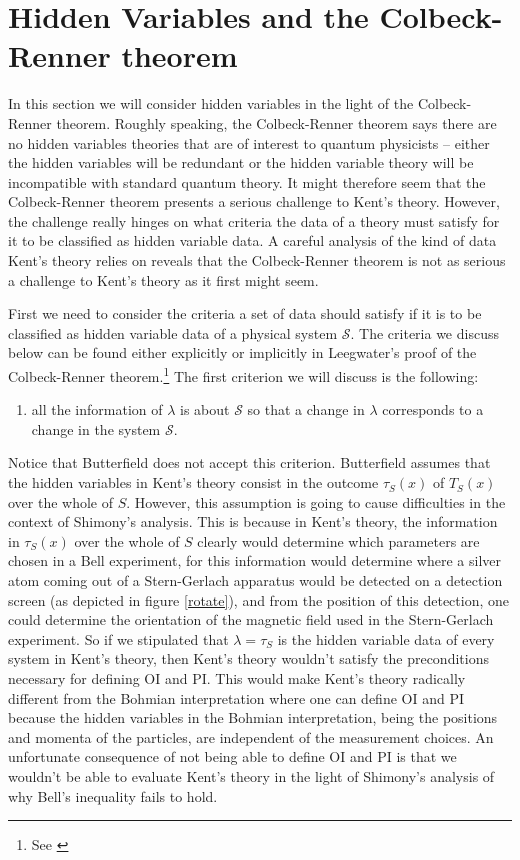 
\section{Hidden Variables and the Colbeck-Renner theorem\label{colbeckrennerthm}}
In this section we will consider hidden variables in the light of the Colbeck-Renner theorem. Roughly speaking, the Colbeck-Renner theorem says there are no hidden variables theories that are of interest to quantum physicists -- either the hidden variables will be redundant or the hidden variable theory will be incompatible with standard quantum theory. It might therefore seem that the Colbeck-Renner theorem presents a serious challenge to Kent's theory. However, the challenge really hinges on what criteria the data of a theory must satisfy for it to be classified as hidden variable data. A careful analysis of the kind of data Kent's theory relies on reveals that the Colbeck-Renner theorem is not as serious a challenge to Kent's theory as it first might seem. 

First we need to consider the criteria a set of data should satisfy if it is to be classified as hidden variable data of a physical system $\mathcal{S}$. The criteria we discuss below can be found either explicitly or implicitly in Leegwater's proof of the Colbeck-Renner theorem.\footnote{See \cite{LeegwaterGijs2016Aitf}} The first criterion we will discuss is the following:
\begin{enumerate}
	\item all the information of $\lambda$ is about $\mathcal{S}$ so that a change in $\lambda$ corresponds to a change in the system $\mathcal{S}$.\label{hidden1}
\end{enumerate} 
Notice that Butterfield does not accept this criterion. Butterfield assumes that the hidden variables in Kent's theory consist in the outcome $\tau_S(x)$ of $T_S(x)$ over the whole of $S$. However, this assumption is going to cause difficulties in the context of Shimony's analysis. This is because in Kent's theory, the information in $\tau_S(x)$ over the whole of $S$ clearly would determine which parameters are chosen in a Bell experiment, for this information would determine where a silver atom coming out of a Stern-Gerlach apparatus would be detected on a detection screen (as depicted in figure \ref{rotate}), and from the position of this detection, one could determine the orientation of the magnetic field used in the Stern-Gerlach experiment. So if we stipulated that $\lambda=\tau_S$ is the hidden variable data of every system in Kent's theory, then Kent's theory wouldn't satisfy the preconditions necessary for defining OI and PI. This would make Kent's theory radically different from the Bohmian interpretation where one can define OI and PI because the hidden variables in the Bohmian interpretation, being the positions and momenta of the particles, are independent of the measurement choices. An unfortunate consequence of not being able to define OI and PI is that we wouldn't be able to evaluate Kent's theory in the light of Shimony's analysis of why Bell's inequality fails to hold. 

